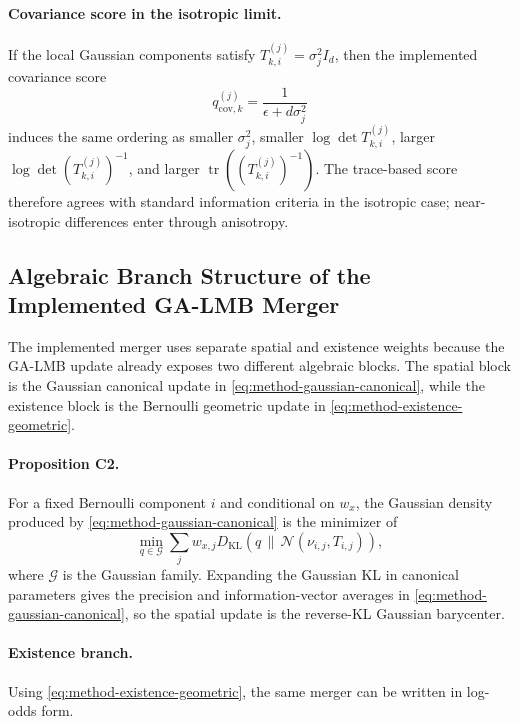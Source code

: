 \paragraph{Covariance score in the isotropic limit.}
If the local Gaussian components satisfy $T_{k,i}^{(j)}=\sigma_j^2I_d$, then the implemented covariance score
\begin{equation}
q_{\mathrm{cov},k}^{(j)} = \frac{1}{\epsilon + d \sigma_j^2}
\end{equation}
induces the same ordering as smaller $\sigma_j^2$, smaller $\log\det T_{k,i}^{(j)}$, larger $\log\det (T_{k,i}^{(j)})^{-1}$, and larger $\operatorname{tr}((T_{k,i}^{(j)})^{-1})$. The trace-based score therefore agrees with standard information criteria in the isotropic case; near-isotropic differences enter through anisotropy.

\subsection{Algebraic Branch Structure of the Implemented GA-LMB Merger}

The implemented merger uses separate spatial and existence weights because the GA-LMB update already exposes two different algebraic blocks. The spatial block is the Gaussian canonical update in \eqref{eq:method-gaussian-canonical}, while the existence block is the Bernoulli geometric update in \eqref{eq:method-existence-geometric}.

\paragraph{Proposition C2.}
For a fixed Bernoulli component $i$ and conditional on $w_x$, the Gaussian density produced by \eqref{eq:method-gaussian-canonical} is the minimizer of
\begin{equation}
\min_{q \in \mathcal{G}}
\sum_j w_{x,j} D_{\mathrm{KL}}\!\left(q \,\|\, \mathcal{N}(\nu_{i,j},T_{i,j})\right),
\end{equation}
where $\mathcal{G}$ is the Gaussian family. Expanding the Gaussian KL in canonical parameters gives the precision and information-vector averages in \eqref{eq:method-gaussian-canonical}, so the spatial update is the reverse-KL Gaussian barycenter.

\paragraph{Existence branch.}
Using \eqref{eq:method-existence-geometric}, the same merger can be written in log-odds form.

